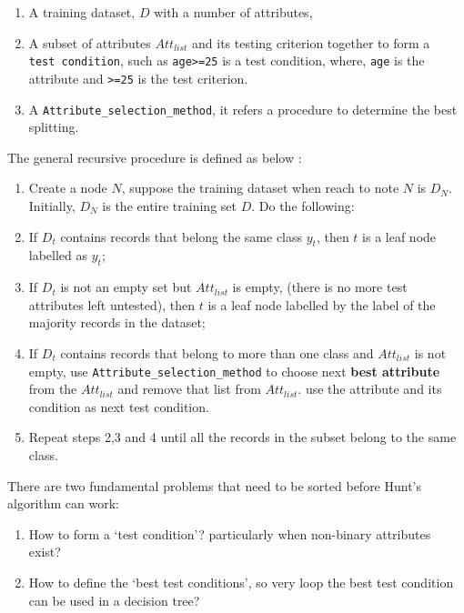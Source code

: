 \documentclass[
]{book}
\providecommand{\tightlist}{%
  \setlength{\itemsep}{0pt}\setlength{\parskip}{0pt}}
\begin{document}
\begin{enumerate}
\def\labelenumi{\arabic{enumi}.}
\tightlist
\item
  A training dataset, \(D\) with a number of attributes,
\item
  A subset of attributes \(Att_{list}\) and its testing criterion together to form a \texttt{\textquotesingle{}test\ condition\textquotesingle{}}, such as \texttt{\textquotesingle{}age\textgreater{}=25\textquotesingle{}} is a test condition, where, \texttt{\textquotesingle{}age\textquotesingle{}} is the attribute and \texttt{\textquotesingle{}\textgreater{}=25\textquotesingle{}} is the test criterion.
\item
  A \texttt{Attribute\_selection\_method}, it refers a procedure to determine the best splitting.
\end{enumerate}

The general recursive procedure is defined as below \citep{Tan2005}:

\begin{enumerate}
\def\labelenumi{\arabic{enumi}.}
\tightlist
\item
  Create a node \(N\), suppose the training dataset when reach to note \(N\) is \(D_{N}\). Initially, \(D_{N}\) is the entire training set \(D\). Do the following:
\item
  If \(D_{t}\) contains records that belong the same class \(y_{t}\), then \(t\) is a leaf node labelled as \(y_{t}\);
\item
  If \(D_{t}\) is not an empty set but \(Att_{list}\) is empty, (there is no more test attributes left untested), then \(t\) is a leaf node labelled by the label of the majority records in the dataset;
\item
  If \(D_{t}\) contains records that belong to more than one class and \(Att_{list}\) is not empty, use \texttt{Attribute\_selection\_method} to choose next \textbf{best attribute} from the \(Att_{list}\) and remove that list from \(Att_{list}\). use the attribute and its condition as next test condition.
\item
  Repeat steps 2,3 and 4 until all the records in the subset belong to the same class.
\end{enumerate}

There are two fundamental problems that need to be sorted before Hunt's algorithm can work:

\begin{enumerate}
\def\labelenumi{\arabic{enumi}.}
\tightlist
\item
  How to form a `test condition'? particularly when non-binary attributes exist?
\item
  How to define the `best test conditions', so very loop the best test condition can be used in a decision tree?
\end{enumerate}
\end{document}
